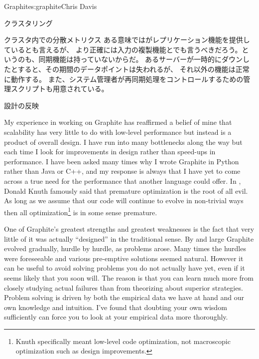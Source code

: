 \begin{aosachapter}{Graphite}{s:graphite}{Chris Davis}
\begin{aosasect1}{クラスタリング}
\begin{aosasect2}{クラスタ内での分散メトリクス}
ある意味ではがレプリケーション機能を提供しているとも言えるが、
より正確には入力の複製機能とでも言うべきだろう。というのも、同期機能は持っていないからだ。
あるサーバーが一時的にダウンしたとすると、その期間のデータポイントは失われるが、
それ以外の機能は正常に動作する。
また、システム管理者が再同期処理をコントロールするための管理スクリプトも用意されている。

\end{aosasect2}

\end{aosasect1}

\begin{aosasect1}{設計の反映}

My experience in working on Graphite has reaffirmed a belief of mine
that scalability has very little to do with low-level performance but
instead is a product of overall design. I have run into many
bottlenecks along the way but each time I look for improvements in
design rather than speed-ups in performance. I have been asked many
times why I wrote Graphite in Python rather than Java or C++, and my
response is always that I have yet to come across a true need for the
performance that another language could offer. In
\cite{bib:knuth:goto}, Donald Knuth famously said that premature
optimization is the root of all evil.  As long as we assume that our
code will continue to evolve in non-trivial ways then all
optimization\footnote{Knuth specifically meant low-level code
optimization, not macroscopic optimization such as design
improvements.} is in some sense premature.

One of Graphite's greatest strengths and greatest weaknesses is the
fact that very little of it was actually ``designed'' in the
traditional sense.  By and large Graphite evolved gradually, hurdle by
hurdle, as problems arose. Many times the hurdles were foreseeable and
various pre-emptive solutions seemed natural. However it can be useful
to avoid solving problems you do not actually have yet, even if it
seems likely that you soon will. The reason is that you can learn much
more from closely studying actual failures than from theorizing about
superior strategies.  Problem solving is driven by both the empirical
data we have at hand and our own knowledge and intuition. I've found
that doubting your own wisdom sufficiently can force you to look at
your empirical data more thoroughly.


\end{aosasect1}
\end{aosachapter}
